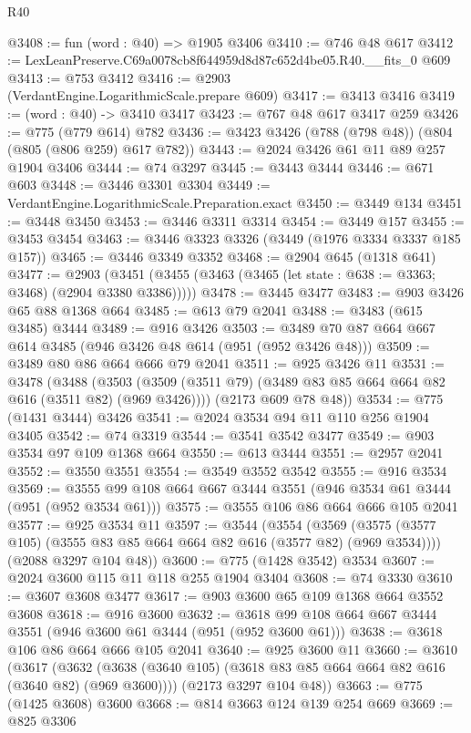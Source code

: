 \begin{lexlean}{R40}
\begin{coremodule}
@3408 := fun (word : @40) => @1905 @3406
@3410 := @746 @48 @617
@3412 := LexLeanPreserve.C69a0078cb8f644959d8d87c652d4be05.R40.__fits_0 @609
@3413 := @753 @3412
@3416 := @2903 (VerdantEngine.LogarithmicScale.prepare @609)
@3417 := @3413 @3416
@3419 := (word : @40) -> @3410 @3417
@3423 := @767 @48 @617 @3417 @259
@3426 := @775 (@779 @614) @782
@3436 := @3423 @3426 (@788 (@798 @48)) (@804 (@805 (@806 @259) @617 @782))
@3443 := @2024 @3426 @61 @11 @89 @257 @1904 @3406
@3444 := @74 @3297
@3445 := @3443 @3444
@3446 := @671 @603
@3448 := @3446 @3301 @3304
@3449 := VerdantEngine.LogarithmicScale.Preparation.exact
@3450 := @3449 @134
@3451 := @3448 @3450
@3453 := @3446 @3311 @3314
@3454 := @3449 @157
@3455 := @3453 @3454
@3463 := @3446 @3323 @3326 (@3449 (@1976 @3334 @3337 @185 @157))
@3465 := @3446 @3349 @3352
@3468 := @2904 @645 (@1318 @641)
@3477 := @2903
    (@3451 (@3455 (@3463 (@3465 (let state : @638 := @3363; @3468) (@2904 @3380 @3386)))))
@3478 := @3445 @3477
@3483 := @903 @3426 @65 @88 @1368 @664
@3485 := @613 @79 @2041
@3488 := @3483 (@615 @3485) @3444
@3489 := @916 @3426
@3503 := @3489 @70 @87 @664 @667 @614 @3485 (@946 @3426 @48 @614 (@951 (@952 @3426 @48)))
@3509 := @3489 @80 @86 @664 @666 @79 @2041
@3511 := @925 @3426 @11
@3531 := @3478
    (@3488
      (@3503 (@3509 (@3511 @79) (@3489 @83 @85 @664 @664 @82 @616 (@3511 @82) (@969 @3426))))
      (@2173 @609 @78 @48))
@3534 := @775 (@1431 @3444) @3426
@3541 := @2024 @3534 @94 @11 @110 @256 @1904 @3405
@3542 := @74 @3319
@3544 := @3541 @3542 @3477
@3549 := @903 @3534 @97 @109 @1368 @664
@3550 := @613 @3444
@3551 := @2957 @2041
@3552 := @3550 @3551
@3554 := @3549 @3552 @3542
@3555 := @916 @3534
@3569 := @3555 @99 @108 @664 @667 @3444 @3551 (@946 @3534 @61 @3444 (@951 (@952 @3534 @61)))
@3575 := @3555 @106 @86 @664 @666 @105 @2041
@3577 := @925 @3534 @11
@3597 := @3544
    (@3554
      (@3569 (@3575 (@3577 @105) (@3555 @83 @85 @664 @664 @82 @616 (@3577 @82) (@969 @3534))))
      (@2088 @3297 @104 @48))
@3600 := @775 (@1428 @3542) @3534
@3607 := @2024 @3600 @115 @11 @118 @255 @1904 @3404
@3608 := @74 @3330
@3610 := @3607 @3608 @3477
@3617 := @903 @3600 @65 @109 @1368 @664 @3552 @3608
@3618 := @916 @3600
@3632 := @3618 @99 @108 @664 @667 @3444 @3551 (@946 @3600 @61 @3444 (@951 (@952 @3600 @61)))
@3638 := @3618 @106 @86 @664 @666 @105 @2041
@3640 := @925 @3600 @11
@3660 := @3610
    (@3617
      (@3632 (@3638 (@3640 @105) (@3618 @83 @85 @664 @664 @82 @616 (@3640 @82) (@969 @3600))))
      (@2173 @3297 @104 @48))
@3663 := @775 (@1425 @3608) @3600
@3668 := @814 @3663 @124 @139 @254 @669
@3669 := @825 @3306

\end{coremodule}
\end{lexlean}
